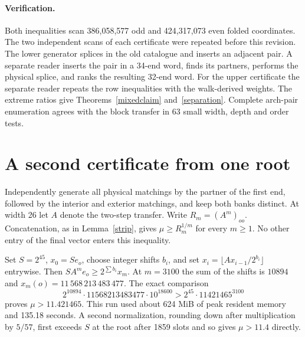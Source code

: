 \documentclass[11pt]{article}
\begin{document}
\paragraph{Verification.} Both inequalities scan 386,058,577 odd and 424,317,073 even folded coordinates. The two independent scans of each certificate were repeated before this revision. The lower generator splices in the old catalogue and inserts an adjacent pair. A separate reader inserts the pair in a 34-end word, finds its partners, performs the physical splice, and ranks the resulting 32-end word. For the upper certificate the separate reader repeats the row inequalities with the walk-derived weights. The extreme ratios give Theorems~\ref{mixedclaim} and~\ref{separation}. Complete arch-pair enumeration agrees with the block transfer in 63 small width, depth and order tests.


\section{A second certificate from one root}
Independently generate all physical matchings by the partner of the first end, followed by the interior and exterior matchings, and keep both banks distinct. At width 26 let \(A\) denote the two-step transfer. Write \(R_m=(A^m)_{oo}\). Concatenation, as in Lemma~\ref{strip}, gives \(\mu\ge R_m^{1/m}\) for every \(m\ge1\). No other entry of the final vector enters this inequality.

Set \(S=2^{45}\), \(x_0=S e_o\), choose integer shifts \(b_i\), and set \(x_i=\lfloor A x_{i-1}/2^{b_i}\rfloor\) entrywise. Then \(S A^m e_o\ge 2^{\sum b_i} x_m\). At \(m=3100\) the sum of the shifts is \(10894\) and \(x_m(o)=11\,568\,213\,483\,477\). The exact comparison
\[
 2^{10894}\cdot 11568213483477\cdot 10^{18600}
       > 2^{45}\cdot 11421465^{3100}
\]
proves \(\mu>11.421465\). This run used about 624 MiB of peak resident memory and 135.18 seconds. A second normalization, rounding down after multiplication by \(5/57\), first exceeds \(S\) at the root after 1859 slots and so gives \(\mu>11.4\) directly.
\end{document}
